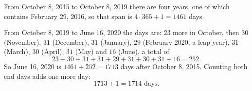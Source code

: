 From October 8, 2015 to October 8, 2019 there are four years, one of which contains February 29, 2016, so that span is $4\cdot365+1=1461$ days.

From October 8, 2019 to June 16, 2020 the days are: $23$ more in October, then $30$ (November), $31$ (December), $31$ (January), $29$ (February 2020, a leap year), $31$ (March), $30$ (April), $31$ (May) and $16$ (June), a total of
\[23+30+31+31+29+31+30+31+16=252 .\]
So June 16, 2020 is $1461+252=1713$ days after October 8, 2015. Counting both end days adds one more day:
\[1713+1=\boxed{1714}\text{ days}.\]
